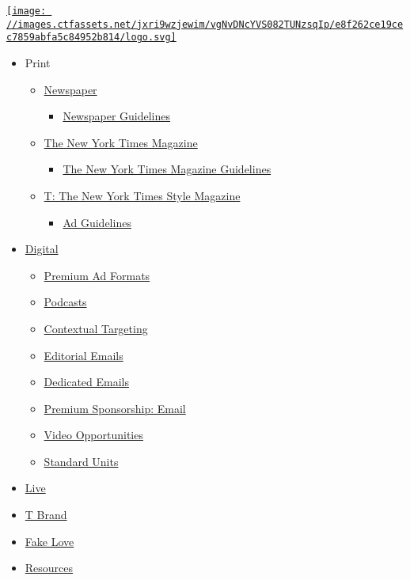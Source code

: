 \href{/}{\texttt{[image: //images.ctfassets.net/jxri9wzjewim/vgNvDNcYVS082TUNzsqIp/e8f262ce19cec7859abfa5c84952b814/logo.svg]}}

\begin{itemize}
\tightlist
\item
  Print

  \begin{itemize}
  \tightlist
  \item
    \href{/newspaper}{Newspaper}

    \begin{itemize}
    \tightlist
    \item
      \href{/newspaper-guidelines}{Newspaper Guidelines}
    \end{itemize}
  \item
    \href{/nytmag}{The New York Times Magazine}

    \begin{itemize}
    \tightlist
    \item
      \href{/nytmag-guidelines}{The New York Times Magazine Guidelines}
    \end{itemize}
  \item
    \href{/t}{T: The New York Times Style Magazine}

    \begin{itemize}
    \tightlist
    \item
      \href{/t-guidelines}{Ad Guidelines}
    \end{itemize}
  \end{itemize}
\item
  \href{/digital}{Digital}

  \begin{itemize}
  \tightlist
  \item
    \href{/proprietary-library}{Premium Ad Formats}
  \item
    \href{/podcasts}{Podcasts}
  \item
    \href{/contextual-targeting}{Contextual Targeting}
  \item
    \href{/editorial-sponsorships}{Editorial Emails}
  \item
    \href{/dedicated-emails}{Dedicated Emails}
  \item
    \href{/premium-sponsorship-email}{Premium Sponsorship: Email}
  \item
    \href{/video-opportunities}{Video Opportunities}
  \item
    \href{/standard-units}{Standard Units}
  \end{itemize}
\item
  \href{http://nytconferences.com}{Live}
\item
  \href{http://www.tbrandstudio.com/}{T Brand}
\item
  \href{http://fakelove.tv/}{Fake Love}
\item
  \href{/general-resources}{Resources}


\end{itemize}

